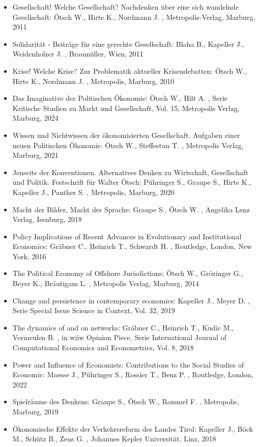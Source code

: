 \begin{itemize}
\item Gesellschaft! Welche Gesellschaft? Nachdenken über eine sich wandelnde Gesellschaft: Ötsch W., Hirte K., Nordmann J. , Metropolis-Verlag, Marburg, 2011
\item Solidarität - Beiträge für eine gerechte Gesellschaft: Blaha B., Kapeller J., Weidenholzer J. , Braumüller, Wien, 2011
\item Krise! Welche Krise? Zur Problematik aktueller Krisendebatten: Ötsch W., Hirte K., Nordmann J. , Metropolis, Marburg, 2010
\item Das Imaginative der Politischen Ökonomie: Ötsch W., Hilt A. , Serie Kritische Studien zu Markt und Gesellschaft, Vol. 15, Metropolis Verlag, Marburg, 2024
\item Wissen und Nichtwissen der ökonomisierten Gesellschaft. Aufgaben einer neuen Politischen Ökonomie: Ötsch W., Steffestun T. , Metropolis Verlag, Marburg, 2021
\item Jenseits der Konventionen. Alternatives Denken zu Wirtschaft, Gesellschaft und Politik. Festschrift für Walter Ötsch: Pühringer S., Graupe S., Hirte K., Kapeller J., Panther S. , Metropolis, Marburg, 2020
\item Macht der Bilder, Macht der Sprache: Graupe S., Ötsch W. , Angelika Lenz Verlag, Isenburg, 2018
\item Policy Implications of Recent Advances in Evolutionary and Institutional Economics: Gräbner C., Heinrich T., Schwardt H. , Routledge, London, New York, 2016
\item The Political Economy of Offshore Jurisdictions: Ötsch W., Grözinger G., Beyer K., Bräutigam L. , Metropolis Verlag, Marburg, 2014
\item Change and persistence in contemporary economics: Kapeller J., Meyer D. , Serie Special Issue Science in Context, Vol. 32, 2019
\item The dynamics of and on networks: Gräbner C., Heinrich T., Kudic M., Vermeulen B. , in wiiw Opinion Piece, Serie International Journal of Computational Economics and Econometrics, Vol. 8, 2018
\item Power and Influence of Economists: Contributions to the Social Studies of Economic: Maesse J., Pühringer S., Rossier T., Benz P. , Routledge, London, 2022
\item Spielräume des Denkens: Graupe S., Ötsch W., Rommel F. , Metropolis, Marburg, 2019
\item Ökonomische Effekte der Verkehrsreform des Landes Tirol: Kapeller J., Böck M., Schütz B., Zens G. , Johannes Kepler Universität, Linz, 2018

\end{itemize}
